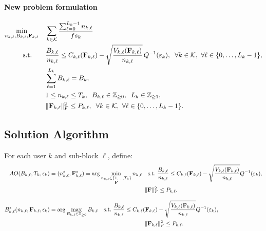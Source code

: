 \documentclass[a4paper, 12pt, onecolumn, journal, twoside, draftclsnofoot]{IEEEtran}
\begin{document}
\paragraph*{New problem formulation}
\begin{equation}
\begin{aligned}
\min_{n_{k,\ell},B_{k,\ell},\F_{k, \ell}}
&\quad \sum_{k \in \mathcal{K}}\frac{\sum_{\ell=0}^{L_k-1} n_{k,\ell}}{fs_k} \\
\text{s.t.}\quad
&\quad \frac{B_{k,\ell}}{n_{k,\ell}}
\le
C_{k,\ell}(\F_{k, \ell} )
-\sqrt{\frac{V_{k,\ell}(\F_{k, \ell} )}{n_{k,\ell}}}\,Q^{-1}(\varepsilon_k),\;\;\forall k \in \mathcal{K},\ \forall \ell \in \{0,\dots,L_k-1\} ,\\
&\quad \sum_{\ell=1}^{L_k} B_{k,\ell}=B_k, \\
&\quad 1\le n_{k,\ell}\le T_k,\;\; B_{k,\ell}\in\mathbb{Z}_{\ge 0},\;\; L_k\in\mathbb{Z}_{\ge 1},\\
&\quad \|\F_{k, \ell} \|_F^2\le P_{k,\ell},\;\;\forall k \in \mathcal{K},\ \forall \ell \in \{0,\dots,L_k-1\}  .
\end{aligned}
\end{equation}


\subsection{Solution Algorithm}

For each user $k$ and sub-block $\ell$, define:
\begin{align}
AO(B_{k,\ell}, T_k, \epsilon_k)
&= (n^*_{k,\ell}, \F^*_{k,\ell}) =
\arg\min_{\substack{n_{k,\ell}\in\{1,\dots,T_k\} \\ \F}}
n_{k,\ell}
\quad
\text{s.t.}\;
\frac{B_{k,\ell}}{n_{k,\ell}}
\le
C_{k,\ell}(\F_{k, \ell})
-
\sqrt{\frac{V_{k,\ell}(\F_{k, \ell})}{n_{k,\ell}}}
Q^{-1}(\varepsilon_k),
\nonumber\\
&\hspace{5.8cm}
\|\F\|_F^2 \le P_{k,\ell}.
\label{eq:oracle_N}
\\[8pt]
B^*_{k,\ell}(n_{k,\ell}, \F_{k, \ell}, \epsilon_k)
&=
\arg\max_{B_{k,\ell}\in\mathbb{Z}_{\ge0}}
B_{k,\ell}
\quad
\text{s.t.}\;
\frac{B_{k,\ell}}{n_{k,\ell}}
\le
C_{k,\ell}(\F_{k, \ell})
-
\sqrt{\frac{V_{k,\ell}(\F_{k, \ell})}{n_{k,\ell}}}
Q^{-1}(\varepsilon_k),
\nonumber\\
&\hspace{5.8cm}
\|\F_{k, \ell}\|_F^2 \le P_{k,\ell}.
\label{eq:oracle_B}
\end{align}
\end{document}

